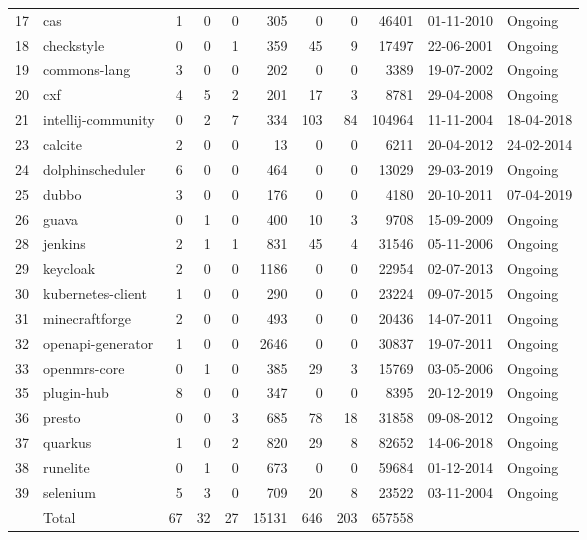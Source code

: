 \begin{landscape}
\begin{table}[H]
\begin{tabular}{rlrrrrrrrrl}
17 & cas & 1 & 0 & 0 & 305 & 0 & 0 & 46401 & 01-11-2010 & Ongoing \\ 
18 & checkstyle & 0 & 0 & 1 & 359 & 45 & 9 & 17497 & 22-06-2001 & Ongoing \\ 
19 & commons-lang & 3 & 0 & 0 & 202 & 0 & 0 & 3389 & 19-07-2002 & Ongoing \\ 
20 & cxf & 4 & 5 & 2 & 201 & 17 & 3 & 8781 & 29-04-2008 & Ongoing \\ 
21 & intellij-community & 0 & 2 & 7 & 334 & 103 & 84 & 104964 & 11-11-2004 & 18-04-2018 \\ 
23 & calcite & 2 & 0 & 0 & 13 & 0 & 0 & 6211 & 20-04-2012 & 24-02-2014 \\ 
24 & dolphinscheduler & 6 & 0 & 0 & 464 & 0 & 0 & 13029 & 29-03-2019 & Ongoing \\ 
25 & dubbo & 3 & 0 & 0 & 176 & 0 & 0 & 4180 & 20-10-2011 & 07-04-2019 \\ 
26 & guava & 0 & 1 & 0 & 400 & 10 & 3 & 9708 & 15-09-2009 & Ongoing \\ 
28 & jenkins & 2 & 1 & 1 & 831 & 45 & 4 & 31546 & 05-11-2006 & Ongoing \\ 
29 & keycloak & 2 & 0 & 0 & 1186 & 0 & 0 & 22954 & 02-07-2013 & Ongoing \\ 
30 & kubernetes-client & 1 & 0 & 0 & 290 & 0 & 0 & 23224 & 09-07-2015 & Ongoing \\ 
31 & minecraftforge & 2 & 0 & 0 & 493 & 0 & 0 & 20436 & 14-07-2011 & Ongoing \\ 
32 & openapi-generator & 1 & 0 & 0 & 2646 & 0 & 0 & 30837 & 19-07-2011 & Ongoing \\ 
33 & openmrs-core & 0 & 1 & 0 & 385 & 29 & 3 & 15769 & 03-05-2006 & Ongoing \\ 
35 & plugin-hub & 8 & 0 & 0 & 347 & 0 & 0 & 8395 & 20-12-2019 & Ongoing \\ 
36 & presto & 0 & 0 & 3 & 685 & 78 & 18 & 31858 & 09-08-2012 & Ongoing \\ 
37 & quarkus & 1 & 0 & 2 & 820 & 29 & 8 & 82652 & 14-06-2018 & Ongoing \\ 
38 & runelite & 0 & 1 & 0 & 673 & 0 & 0 & 59684 & 01-12-2014 & Ongoing \\ 
39 & selenium & 5 & 3 & 0 & 709 & 20 & 8 & 23522 & 03-11-2004 & Ongoing \\ 
\hline 
 & Total & 67 & 32 & 27 & 15131 & 646 & 203 & 657558 &  & \\ 
\hline 
\bottomrule
\end{tabular}%
\label{tab:codebase_graph_latex_repository_summary} 
\end{table}
\end{landscape}
\newpage 
